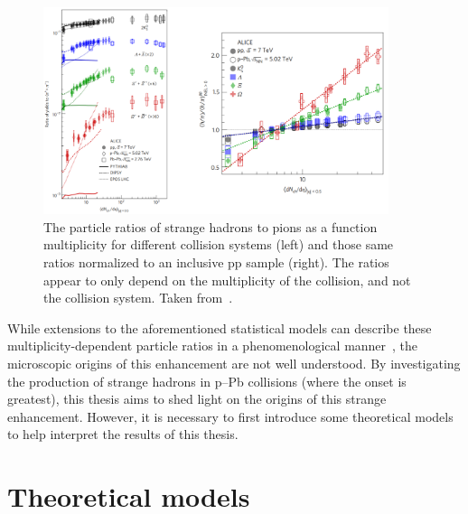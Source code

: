  \begin{figure}
    \centering
    \includegraphics[width=0.9\textwidth]{figures/introduction/strangeness_enhancement.png}
    \caption{The particle ratios of strange hadrons to pions as a function multiplicity for different collision systems (left) and those same ratios normalized to an inclusive pp sample (right). The ratios appear to only depend on the multiplicity of the collision, and not the collision system. Taken from~\cite{NATURE}.}
    \label{fig:strangeness_enhancement}
\end{figure}
 
While extensions to the aforementioned statistical models can describe these multiplicity-dependent particle ratios in a phenomenological manner~\cite{NATURE17}, the microscopic origins of this enhancement are not well understood. By investigating the production of strange hadrons in p--Pb collisions (where the onset is greatest), this thesis aims to shed light on the origins of this strange enhancement. However, it is necessary to first introduce some theoretical models to help interpret the results of this thesis.


\section{Theoretical models}
\label{sec:models}

